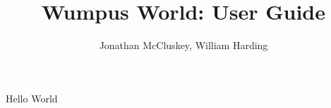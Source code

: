 \documentclass[10pt,a4paper]{book}
\author{Jonathan McCluskey, William Harding}
\title{Wumpus World: User Guide}
\begin{document}
Hello World
\end{document}
